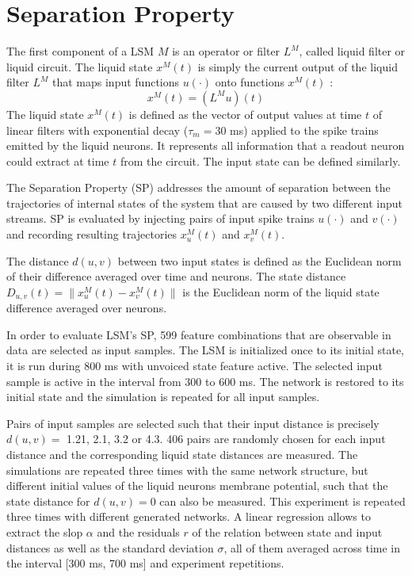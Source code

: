 \documentclass[11pt, a4paper]{article} %
\begin{document}
\section{Separation Property}
The first component of a LSM $M$ is an operator or filter $L^M$, called liquid filter or liquid circuit. The liquid state $x^M(t)$ is simply the current output of the liquid filter $L^M$ that maps input functions $u(\cdot)$ onto functions $x^M(t)$ \cite{maass2002real}: \begin{equation}
x^M(t) = (L^M u)(t)
\end{equation}
The liquid state $x^M(t)$ is defined as the vector of output values at time $t$ of linear filters with exponential decay ($\tau_m = 30$ ms) applied to the spike trains emitted by the liquid neurons. It represents all information that a readout neuron could extract at time $t$ from the circuit. The input state can be defined similarly.

The Separation Property (SP) addresses the amount of separation between the trajectories of internal states of the system that are caused by two different input streams. SP is evaluated by injecting pairs of input spike trains $u(\cdot)$ and $v(\cdot)$ and recording resulting trajectories $x_u^M(t)$ and $x_v^M(t)$. 

The distance $d(u,v)$ between two input states is defined as the Euclidean norm of their difference averaged over time and neurons. The state distance $D_{u,v}(t) = \parallel x_u^M(t) - x_v^M(t)\parallel$ is the Euclidean norm of the liquid state difference averaged over neurons.

In order to evaluate LSM's SP, 599 feature combinations that are observable in data are selected as input samples. The LSM is initialized once to its initial state, it is run during 800 ms with unvoiced state feature active. The selected input sample is active in the interval from 300 to 600 ms. The network is restored to its initial state and the simulation is repeated for all input samples.

Pairs of input samples are selected such that their input distance is precisely $d(u,v) =$ 1.21, 2.1, 3.2 or 4.3. 406 pairs are randomly chosen for each input distance and the corresponding liquid state distances are measured. The simulations are repeated three times with the same network structure, but different initial values of the liquid neurons membrane potential, such that the state distance for $d(u,v) = 0$ can also be measured. This experiment is repeated three times with different generated networks. A linear regression allows to extract the slop $\alpha$ and the residuals $r$ of the relation between state and input distances as well as the standard deviation $\sigma$, all of them averaged across time in the interval [300 ms, 700 ms] and experiment repetitions.
\end{document}
